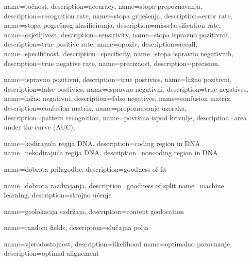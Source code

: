 {
  name={točnost},
  description={accuracy},
}
{
  name={stopa prepoznavanja},
  description={recognition rate},
}
{
  name={stopa griješenja},
  description={error rate},
}
{
  name={stopa pogrešnog klasificiranja},
  description={missclassification rate},
}
{
  name={osjetljivost},
  description={sensitivity},
}
{
  name={stopa ispravno pozitivnih},
  description={true positive rate},
}
{
  name={opoziv},
  description={recall},
}
{
  name={specifičnost},
  description={specificity},
}
{
  name={stopa ispravno negativnih},
  description={true negative rate},
}
{
  name={preciznost},
  description={precision},
}

{
  name={ispravno pozitivni},
  description={true postivies},
}
{
  name={lažno pozitivni},
  description={false postivies},
}
{
  name={ispravno negativni},
  description={true negatives},
}
{
  name={lažno negativni},
  description={false negatives},
}
{
  name={confusion matrix},
  description={confusion matrix},
}
{
  name={prepoznavanje uzoraka},
  description={pattern recognition},
}
{
  name={površina ispod krivulje},
  description={area under the curve (AUC)},
}

{
  name={kodirajuća regija DNA},
  description={coding region in DNA}
}
{
  name={nekodirajuća regija DNA},
  description={noncoding region in DNA}
}

{
  name={dobrota prilagodbe},
  description={goodness of fit}
}

{
  name={dobrota razdvajanja},
  description={goodness of split}
}
{
  name={machine learning},
  description={strojno učenje}
}

{
  name={geolokacija sadržaja},
  description={content geolocation}
}

{
  name={random fields},
  description={slučajna polja}
}

{
  name={vjerodostojnost},
  description={likelihood}
}
{
  name={optimalno poravnanje},
  description={optimal alignement}
}
